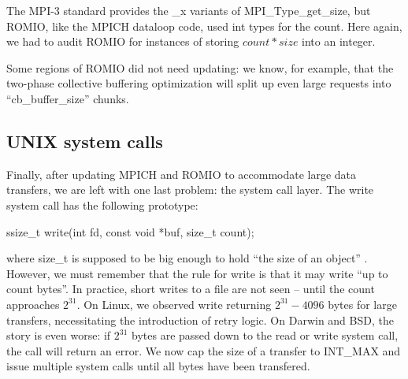 The MPI-3 standard provides the \_x variants of MPI\_Type\_get\_size, but
ROMIO, like the MPICH dataloop code, used int types for the count.
Here again,  we had to audit ROMIO for instances of storing $count * size$
into an integer.

Some regions of ROMIO did not need updating: we know, for example, that the
two-phase collective buffering optimization will split up even large requests
into ``cb\_buffer\_size'' chunks.

\subsection{UNIX system calls}

Finally, after updating MPICH and ROMIO to accommodate large data transfers,
we are left with one last problem: the system call layer.
The write system call has the following prototype:

\begin{code}
ssize_t write(int fd, const void *buf, size_t count);
\end{code}

where size\_t is supposed to be big enough to hold ``the size of an object''
\cite{posix-std}.  However, we must remember that the rule for write is that it may
write ``up to count bytes''.  In practice, short writes to a file are not seen --
until the count approaches $2^{31}$.  On Linux, we observed write returning
$2^{31}-4096$ bytes for large transfers, necessitating the introduction of retry
logic.  On Darwin and BSD, the story is even worse: if $2^{31}$ bytes are passed
down to the read or write system call, the call will return an error.  We now
cap the size of a transfer to INT\_MAX and issue multiple system calls until
all bytes have been transfered.
